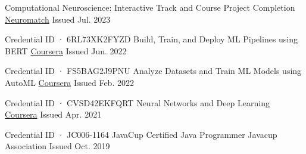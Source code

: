 

\begin{cventries}

  \cventry%
    {} %
    {Computational Neuroscience: Interactive Track and Course Project Completion} %
    {\href{https://portal.neuromatchacademy.org/certificate/9163b83a-649a-4d6b-a208-4d96a32a447e}{Neuromatch}} %
    {Issued Jul. 2023} %
    {}

  \cventry%
    {\upshape Credential ID · 6RL73XK2FYZD} %
    {Build, Train, and Deploy ML Pipelines using BERT} %
    {\href{https://coursera.org/share/070aeca0fe35f95d6dd490b63683a7bd}{Coursera}} %
    {Issued Jun. 2022} %
    {}

  \cventry%
    {\upshape Credential ID · FS5BAG2J9PNU} %
    {Analyze Datasets and Train ML Models using AutoML} %
    {\href{https://coursera.org/share/15e8f50205461ac49b73f692a4c2cb69}{Coursera}} %
    {Issued Feb. 2022} %
    {}

  \cventry%
    {\upshape Credential ID · CVSD42EKFQRT} %
    {Neural Networks and Deep Learning} %
    {\href{https://coursera.org/share/15e1ccfd8eebaf82362e2757bdf2a860}{Coursera}} %
    {Issued Apr. 2021} %
    {}

  \cventry%
    {\upshape Credential ID · JC006-1164} %
    {JavaCup Certified Java Programmer} %
    {Javacup Association} %
    {Issued Oct. 2019} %
    {}


\end{cventries}

